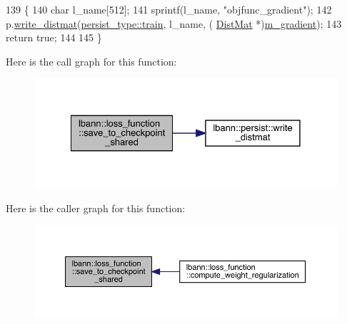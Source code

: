 \begin{DoxyCode}
139                                                            \{
140     \textcolor{keywordtype}{char} l\_name[512];
141     sprintf(l\_name, \textcolor{stringliteral}{"objfunc\_gradient"});
142     p.\hyperlink{classlbann_1_1persist_a9170de652405d86d9ba9b3793f8781c6}{write\_distmat}(\hyperlink{namespacelbann_adee41f31f15f3906cbdcce4a1417eb56a61b3a8faa9c1091806675c230a9abe64}{persist\_type::train}, l\_name, (
      \hyperlink{base_8hpp_a0fab5387556805cfeac3e7e567bf66c5}{DistMat} *)\hyperlink{classlbann_1_1loss__function_ac6ac9f8f2cef7a4daa1b282dba914975}{m\_gradient});
143     \textcolor{keywordflow}{return} \textcolor{keyword}{true};
144 
145   \}
\end{DoxyCode}
Here is the call graph for this function\+:\nopagebreak
\begin{figure}[H]
\begin{center}
\leavevmode
\includegraphics[width=328pt]{classlbann_1_1loss__function_ac44929838f3c3f0a34e1532530422dad_cgraph}
\end{center}
\end{figure}
Here is the caller graph for this function\+:\nopagebreak
\begin{figure}[H]
\begin{center}
\leavevmode
\includegraphics[width=350pt]{classlbann_1_1loss__function_ac44929838f3c3f0a34e1532530422dad_icgraph}
\end{center}
\end{figure}
\mbox{\label{classlbann_1_1loss__function_a9ef5356468c892c2c0221f8acd6b5471}} 
